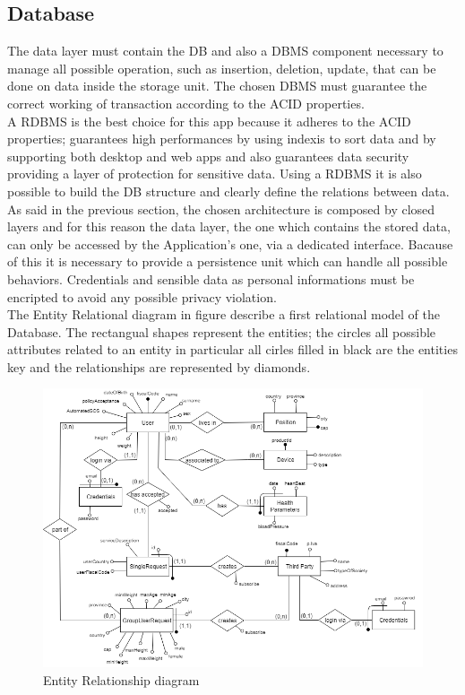 \subsection{Database}
The data layer must contain the DB and also a DBMS component necessary to manage all possible operation, such as insertion, deletion, update, that can be done on data inside the storage unit. The chosen DBMS must guarantee the correct working of transaction according to the ACID properties.\\A RDBMS is the best choice for this app because it adheres to the ACID properties; guarantees high performances by using indexis to sort data and by supporting both desktop and web apps and also guarantees data security providing a layer of protection for sensitive data. Using a RDBMS it is also possible to build  the DB structure and clearly define the relations between data.\\ As said in the previous section, the chosen architecture is composed by closed layers and for this reason  the data layer, the one which contains the stored data, can only be accessed by the Application's one, via a dedicated interface. Bacause of this it is necessary to provide a persistence unit which can handle all possible behaviors. Credentials and sensible data as personal informations must be encripted to avoid any possible privacy violation.\\
The Entity Relational diagram in figure describe a first relational model of the Database. The rectangual shapes represent the entities; the circles all possible attributes related to an entity in particular all cirles filled in black are the entities key and the relationships are represented by diamonds.

\begin{figure}[h!]
	\includegraphics[width=1.20\textwidth]{./pictures/ER_diagram.png}\par
	\caption{Entity Relationship diagram}
\end{figure}
\FloatBarrier